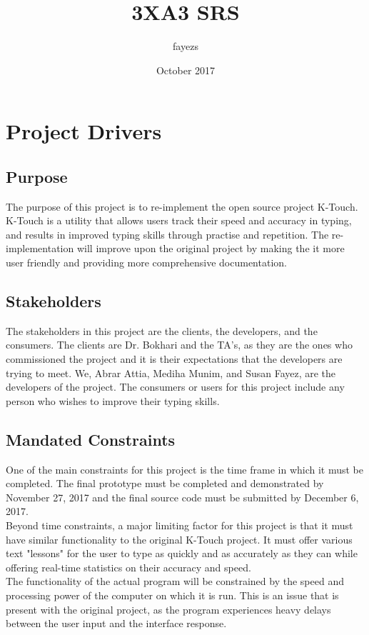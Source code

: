 \documentclass{article}
\title{3XA3 SRS}
\author{fayezs }
\date{October 2017}
\begin{document}
\maketitle

\section{Project Drivers}
\subsection{Purpose}
\indent \indent The purpose of this project is to re-implement the open source project K-Touch. K-Touch is a utility that allows users track their speed and accuracy in typing, and results in improved typing skills through practise and repetition. The re-implementation will improve upon the original project by making the it more user friendly and providing more comprehensive documentation.

\subsection{Stakeholders}
\indent \indent The stakeholders in this project are the clients, the developers, and the consumers. The clients are Dr. Bokhari and the TA's, as they are the ones who commissioned the project and it is their expectations that the developers are trying to meet. We, Abrar Attia, Mediha Munim, and Susan Fayez, are the developers of the project. The consumers or users for this project include any person who wishes to improve their typing skills.

\subsection{Mandated Constraints}
\indent \indent One of the main constraints for this project is the time frame in which it must be completed. The final prototype must be completed and demonstrated by November 27, 2017 and the final source code must be submitted by December 6, 2017.
\\
\indent Beyond time constraints, a major limiting factor for this project is that it must have similar functionality to the original K-Touch project. It must offer various text "lessons" for the user to type as quickly and as accurately as they can while offering real-time statistics on their accuracy and speed. 
\\
\indent The functionality of the actual program will be constrained by the speed and processing power of the computer on which it is run. This is an issue that is present with the original project, as the program experiences heavy delays between the user input and the interface response.
\end{document}

